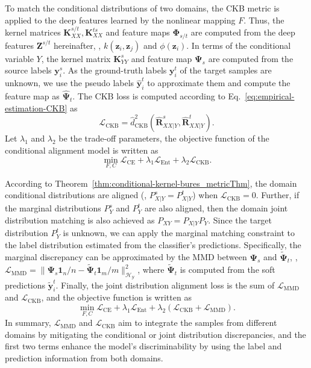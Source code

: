 \documentclass[final]{cvpr}
\newcommand{\MC}{\mathcal}
\newcommand{\MBF}{\mathbf}
\begin{document}
To match the conditional distributions of two domains, the CKB metric is applied to the deep features learned by the nonlinear mapping $F$. Thus, the kernel matrices $\MBF{K}_{XX}^{s/t},\MBF{K}_{XX}^{ts}$ and feature maps $\MBF{\Phi}_{s/t}$ are computed from the deep features $\MBF{Z}^{s/t}$ hereinafter, \ie, $k(\MBF{z}_i,\MBF{z}_j)$ and $\phi(\MBF{z}_i)$. In terms of the conditional variable $Y$, the kernel matrix $\MBF{K}_{YY}^{s}$ and feature map $\MBF{\Psi}_s$ are computed from the source labels $\MBF{y}_i^s$. As the ground-truth labels $\MBF{y}_i^t$ of the target samples are unknown, we use the pseudo labels $\hat{\MBF{y}}_i^{t}$ to approximate them and compute the feature map as $\hat{\MBF{\Psi}}_t$. The CKB loss is computed according to Eq.~\eqref{eq:empirical-estimation-CKB} as %
\begin{equation*}\label{eq:loss_CKB}
\MC{L}_{\text{CKB}} = \hat{d}^2_{\text{CKB}} (\hat{\MBF{R}}^{s}_{XX|Y},\hat{\MBF{R}}^{t}_{XX|Y}).
\end{equation*}
Let $\lambda_1$ and $\lambda_2$ be the trade-off parameters, the objective function of the conditional alignment model is written as
\begin{equation}\label{eq:objective-CKB}
\min_{F, C} \MC{L}_{\text{CE}} + \lambda_1 \MC{L}_{\text{Ent}} + \lambda_2 \MC{L}_{\text{CKB}}.
\end{equation}

According to Theorem~\ref{thm:conditional-kernel-bures_metricThm}, the domain conditional distributions are aligned (\ie, $P_{X|Y}^s=P_{X|Y}^t$) when $\MC{L}_{\text{CKB}} = 0$. Further, if the marginal distributions $P_{Y}^s$ and $P_{Y}^t$ are also aligned, then the domain joint distribution matching is also achieved as $P_{XY} = P_{X|Y}P_{Y}$. Since the target distribution $P_{Y}^t$ is unknown, we can apply the marginal matching constraint to the label distribution estimated from the classifier's predictions. Specifically, the marginal discrepancy can be approximated by the MMD between $\MBF{\Psi}_s$ and $\tilde{\MBF{\Psi}}_t$, \ie, $\MC{L}_{\text{MMD}} = \| \MBF{\Psi}_s \MBF{1}_n / n - \tilde{\MBF{\Psi}}_t \MBF{1}_m / m \|^2_{\MC{H}_{\MC{Y}}}$, where $\tilde{\MBF{\Psi}}_t$ is computed from the soft predictions $\tilde{\MBF{y}}_i^{t}$. Finally, the joint distribution alignment loss is the sum of $\MC{L}_{\text{MMD}}$ and $\MC{L}_{\text{CKB}}$, and the objective function is written as
\begin{equation}\label{eq:objective-CKB-MMD}
\min_{F, C} \MC{L}_{\text{CE}} + \lambda_1 \MC{L}_{\text{Ent}} + \lambda_2 (\MC{L}_{\text{CKB}} + \MC{L}_{\text{MMD}}).
\end{equation}
In summary, $\MC{L}_{\text{MMD}}$ and $\MC{L}_{\text{CKB}}$ aim to integrate the samples from different domains by mitigating the conditional or joint distribution discrepancies, and the first two terms enhance the model's discriminability by using the label and prediction information from both domains.
\end{document}
